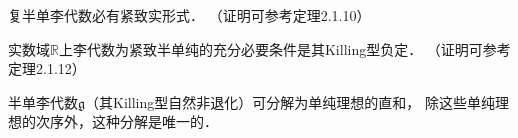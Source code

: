 
\begin{theorem}\label{chlg:thm_semi-cx-rc}
    复半单李代数必有紧致实形式．
    （证明可参考\parencite[p.109]{xuyc-2001}定理2.1.10）
\end{theorem}


\begin{theorem}\label{chlg:thm_LA-semi-real-compact}
    实数域$\mathbb{R}$上李代数为{\kaishu 紧致半单纯}的充分必要条件是其Killing型负定．
    （证明可参考\parencite[p.113]{xuyc-2001}定理2.1.12）
\end{theorem}




\begin{theorem}\label{chlg:thm_LA-Decom-semi}
    半单李代数$\mathfrak{g}$（其Killing型自然非退化）可分解为单纯理想的直和，
    除这些单纯理想的次序外，这种分解是唯一的．
\end{theorem}
